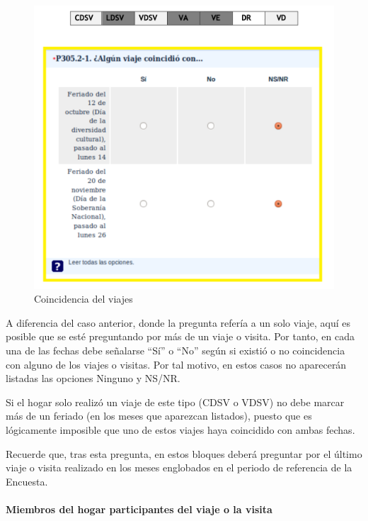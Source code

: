 \documentclass[
  openany]{book}
\begin{document}
\begin{figure}

{\centering \includegraphics[width=1\linewidth]{imagenes/figura6-91} 

}

\caption{Coincidencia del viajes}\label{fig:coincidencias2}
\end{figure}

A diferencia del caso anterior, donde la pregunta refería a un solo viaje, aquí es posible que se esté preguntando por más de un viaje o visita. Por tanto, en cada una de las fechas debe señalarse ``Sí'' o ``No'' según si existió o no coincidencia con alguno de los viajes o visitas. Por tal motivo, en estos casos no aparecerán listadas las opciones Ninguno y NS/NR.

Si el hogar solo realizó un viaje de este tipo (CDSV o VDSV) no debe marcar más de un feriado (en los meses que aparezcan listados), puesto que es lógicamente imposible que uno de estos viajes haya coincidido con ambas fechas.

Recuerde que, tras esta pregunta, en estos bloques deberá preguntar por el último viaje o visita realizado en los meses englobados en el periodo de referencia de la Encuesta.

\hypertarget{miembros-del-hogar-participantes-del-viaje-o-la-visita}{%
\paragraph{Miembros del hogar participantes del viaje o la visita}\label{miembros-del-hogar-participantes-del-viaje-o-la-visita}}
\end{document}
